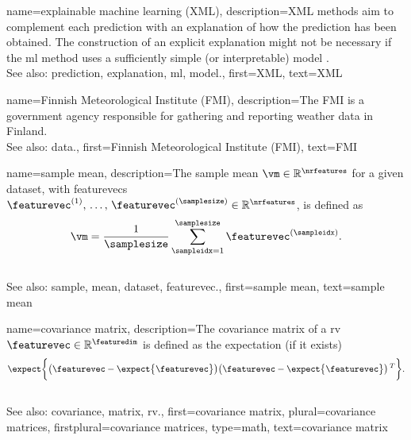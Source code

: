 {name={explainable machine learning (XML)}, 
	description={XML 
		methods aim to complement each \gls{prediction} with an \gls{explanation} of 
		how the \gls{prediction} has been obtained. The construction of an explicit \gls{explanation} 
		might not be necessary if the \gls{ml} method uses a sufficiently simple (or interpretable) \gls{model} \cite{rudin2019stop}.
				\\
		See also: \gls{prediction}, \gls{explanation}, \gls{ml}, \gls{model}.},
	first={XML},
	text={XML} 
}

{name={Finnish Meteorological Institute (FMI)}, 
	description={The
		FMI is a government agency responsible for gathering 
		and reporting weather \gls{data} in Finland.
				\\
		See also: \gls{data}.},
	first={Finnish Meteorological Institute (FMI)},
	text={FMI} 
}
	
	
{name={sample mean}, 
	description={The \gls{sample} \gls{mean} 
		$\vm \in \mathbb{R}^{\nrfeatures}$ for a given \gls{dataset}, with \glspl{featurevec} 
		$\featurevec^{(1)}, \,\ldots, \,\featurevec^{(\samplesize)} \in \mathbb{R}^{\nrfeatures}$, is defined as 
		$$\vm = \frac{1}{\samplesize} \sum_{\sampleidx=1}^{\samplesize} \featurevec^{(\sampleidx)}.$$ 
					\\
		See also: \gls{sample}, \gls{mean}, \gls{dataset}, \gls{featurevec}.},
	first={sample mean},
	text={sample mean} 
}

	
{name={covariance matrix}, 
	description={The \gls{covariance} \gls{matrix} of 
	       a \gls{rv} $\featurevec \in \mathbb{R}^{\featuredim}$ is defined as 
		   the \gls{expectation} (if it exists)
		   $$\expect \bigg \{ \big( \featurevec - \expect \big\{ \featurevec \big\} \big)  
		   \big(\featurevec - \expect \big\{ \featurevec \big\} \big)\,^{T} \bigg\}.$$
				\\
		See also: \gls{covariance}, \gls{matrix}, \gls{rv}.},
	first={covariance matrix},
	plural={covariance matrices},
	firstplural={covariance matrices},
	type=math, 
	text={covariance matrix} 
}

